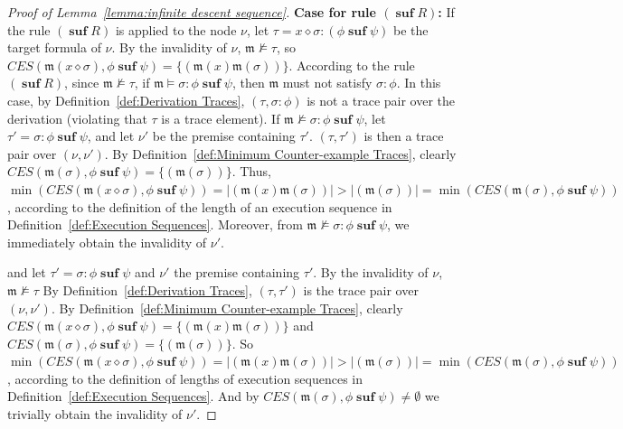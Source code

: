 \documentclass[manuscript,screen]{acmart}
\newcommand{\mfr}[1]{\mathfrak{#1}}
\newcommand{\lm}[0]{\mfr{m}}
\newcommand{\EX}[0]{\textit{CES}}
\newcommand{\cat}[0]{\diamond}
\DeclareMathOperator{\ofst}{\mathbf{f}}
\DeclareMathOperator{\osuf}{\mathbf{suf}}
\begin{document}
\begin{proof}[Proof of Lemma~\ref{lemma:infinite descent sequence}]


    \textbf{Case for rule $(\osuf R)$: }
If the rule $(\osuf R)$ is applied to the node $\nu$, let $\tau = x\cat \sigma : (\phi\osuf \psi)$ be the target formula of $\nu$. 
    By the invalidity of $\nu$, $\lm\not\models \tau$, so $\EX(\lm(x\cat \sigma), \phi\osuf \psi) = \{(\lm(x)\lm(\sigma))\}$. 
According to the rule $(\osuf R)$, since $\lm\not\models \tau$, if $\lm\models \sigma : \phi\osuf \psi$, then $\lm$ must not satisfy $\sigma : \phi$. In this case, by Definition~\ref{def:Derivation Traces}, $(\tau, \sigma : \phi)$ is not a trace pair over the derivation (violating that $\tau$ is a trace element). 
If $\lm\not\models \sigma : \phi\osuf \psi$, let $\tau' = \sigma : \phi\osuf \psi$, and let $\nu'$ be the premise containing $\tau'$. 
    $(\tau, \tau')$ is then a trace pair over $(\nu, \nu')$. 
    By Definition~\ref{def:Minimum Counter-example Traces}, clearly $\EX(\lm(\sigma), \phi\osuf \psi) = \{(\lm(\sigma))\}$. 
Thus, $\min(\EX(\lm(x\cat \sigma), \phi\osuf \psi)) = |(\lm(x)\lm(\sigma))| > |(\lm(\sigma))| = \min(\EX(\lm(\sigma), \phi\osuf \psi))$, according to the definition of the length of an execution sequence in Definition~\ref{def:Execution Sequences}. 
Moreover, from $\lm\not\models \sigma : \phi\osuf \psi$, we immediately obtain the invalidity of $\nu'$. 

    \ifx
    and let $\tau' = \sigma : \phi\osuf \psi$ and $\nu'$ the premise containing $\tau'$. 
    By the invalidity of $\nu$, $\lm\not\models \tau$
    By Definition~\ref{def:Derivation Traces}, $(\tau, \tau')$ is the trace pair over $(\nu, \nu')$. 
    By Definition~\ref{def:Minimum Counter-example Traces}, clearly $\EX(\lm(x\cat \sigma), \phi\osuf \psi) = \{(\lm(x)\lm(\sigma))\}$ and $\EX(\lm(\sigma), \phi\osuf \psi) = \{(\lm(\sigma))\}$.
    So $\min(\EX(\lm(x\cat \sigma), \phi\osuf \psi)) = |(\lm(x)\lm(\sigma))| > |(\lm(\sigma))| = \min(\EX(\lm(\sigma), \phi\osuf \psi))$, according to the definition of lengths of execution sequences in Definition~\ref{def:Execution Sequences}. 
    And by $\EX(\lm(\sigma), \phi\osuf \psi)\neq\emptyset$ we trivially obtain the invalidity of $\nu'$. 



\end{proof}
\end{document}
